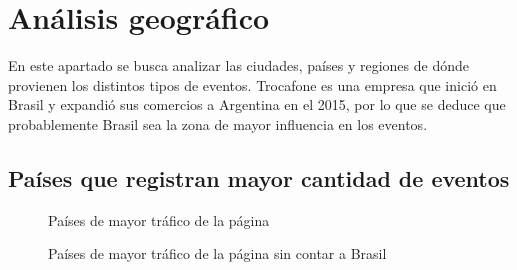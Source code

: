 \documentclass[a4paper]{article}
\begin{document}
\section{Análisis geográfico}

En este apartado se busca analizar las ciudades, países y regiones de dónde provienen los distintos tipos de eventos. Trocafone es una empresa que inició en Brasil y expandió sus comercios a Argentina en el 2015, por lo que se deduce que probablemente Brasil sea la zona de mayor influencia en los eventos.

\subsection{Países que registran mayor cantidad de eventos} 

\begin{figure}[!h]
	\caption{Países de mayor tráfico de la página}
	\label{fig:brazilrules}
\end{figure}

\begin{figure}[!h]
	\caption{Países de mayor tráfico de la página sin contar a Brasil}
	\label{fig:brazilsucks}
\end{figure}
\end{document}
